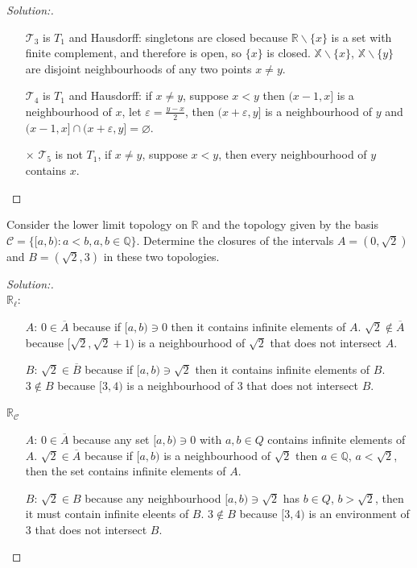 \documentclass[a4paper,12pt, reqno]{article}
\theoremstyle{definition}
\newenvironment{exerr}[1]{
  \renewcommand\theexeralt{#1}
  \exeralt
}{\endexeralt}
\newenvironment{solution}{\begin{proof}[Solution:]}{\end{proof}}
\newcommand{\R}{\mathbb{R}}
\newcommand{\Q}{\mathbb{Q}}
\newcommand{\T}{\mathscr{T}}
\newcommand{\C}{\mathscr{C}}
\newcommand{\X}{\mathbb{X}}
\begin{document}
\begin{solution}
\begin{enumerate}[label = (\alph*)]
\begin{itemize}
            \item[\checkmark] $\T_{3}$ is $T_{1}$ and Hausdorff: singletons are closed because $\R\backslash\{ x \}$ is a set with finite complement, and therefore is open, so $\{ x \}$ is closed. $\X\backslash\{ x \}$, $\X\backslash\{ y \}$ are disjoint neighbourhoods of any two points $x\neq y$.
            \item[\checkmark] $\T_{4}$ is $T_{1}$ and Hausdorff: if $x\neq y$, suppose $x<y$ then $(x-1,x]$ is a neighbourhood of $x$, let $\varepsilon = \frac{y-x}{2}$, then $(x+\varepsilon,y]$ is a neighbourhood of $y$ and $(x-1,x]\cap (x+\varepsilon,y] = \varnothing$.
            \item[$\times$] $\T_{5}$ is not $T_{1}$, if $x\neq y$, suppose $x<y$, then every neighbourhood of $y$ contains $x$.
          \end{itemize}
  \end{enumerate}
\end{solution}

\begin{exerr}{17}
  Consider the lower limit topology on $\R$ and the topology given by the basis $\C = \{ [a,b) : a<b, a,b\in\Q \}$. Determine the closures of the intervals $A = (0,\sqrt{2})$ and $B = (\sqrt{2},3)$ in these two topologies.
\end{exerr}
\begin{solution}\hfill\\

  \noindent$\R_{\ell}$:
  \begin{itemize}
    \item[$A$:] $0\in \overline{A}$ because if $[a,b)\ni 0$ then it contains infinite elements of $A$. $\sqrt{2}\notin \overline{A}$ because $[\sqrt{2},\sqrt{2}+1)$ is a neighbourhood of $\sqrt{2}$ that does not intersect $A$.
    \item[$B$:] $\sqrt{2}\in \overline{B}$ because if $[a,b)\ni\sqrt{2}$ then it contains infinite elements of $B$. $3\notin B$ because $[3,4)$ is a neighbourhood of $3$ that does not intersect $B$.
  \end{itemize}
  $\R_{\C}$
  \begin{itemize}
    \item[$A$:] $0\in \overline{A}$ because any set $[a,b)\ni0$ with $a,b\in Q$ contains infinite elements of $A$. $\sqrt{2}\in \overline{A}$ because if $[a,b)$ is a neighbourhood of $\sqrt{2}$ then $a\in\Q$, $a<\sqrt{2}$, then the set contains infinite elements of $A$.
    \item[$B$:] $\sqrt{2}\in B$ because any neighbourhood $[a,b)\ni\sqrt{2}$ has $b\in Q$, $b>\sqrt{2}$, then it must contain infinite eleents of $B$. $3\notin B$ because $[3,4)$ is an environment of $3$ that does not intersect $B$.
  \end{itemize}
\end{solution}
\end{document}
